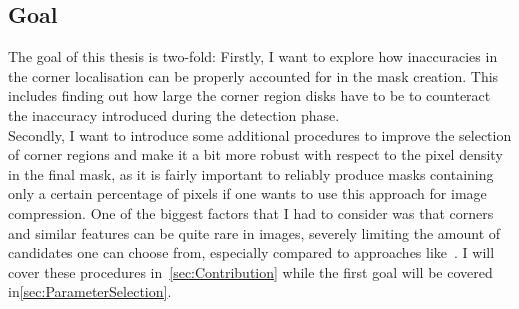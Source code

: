 \subsection*{Goal}\label{ssub:Goal}

The goal of this thesis is two-fold:
Firstly, I want to explore how inaccuracies in the corner localisation can be properly accounted
for in the mask creation. This includes finding out how large the corner region disks have to be to
counteract the inaccuracy introduced during the detection phase.\\
Secondly, I want to introduce some additional procedures to improve the selection of corner regions
and make it a bit more robust with respect to the pixel density in the final mask, as it is fairly
important to reliably produce masks containing only a certain percentage of pixels if one wants to
use this approach for image compression.
One of the biggest factors that I had to consider was that corners and similar features can be quite 
rare in images, severely limiting the amount of candidates one can choose from, especially compared to
approaches like~\cite{schmaltz09, hoeltgen12}. 
I will cover these procedures in~\ref{sec:Contribution} while the first goal will be covered
in\ref{sec:ParameterSelection}.
